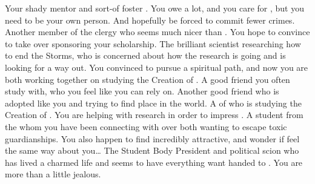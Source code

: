 \documentclass[char]{GL2020}
\begin{document}
\begin{contacts}
    \contact{\cAntiChup{}} Your shady mentor and sort-of foster \cAntiChup{\parent}. You owe \cAntiChup{\them} a lot, and you care for \cAntiChup{\them}, but you need to be your own person. And hopefully be forced to commit fewer crimes.
    \contact{\cBeetle{}} Another member of the \pTech{} clergy who seems much nicer than \cAntiChup{}. You hope to convince \cBeetle{\them} to take over sponsoring your scholarship.
    \contact{\cHeadScientist{}} The brilliant scientist researching how to end the Storms, who is concerned about how the research is going and is looking for a way out. You convinced \cHeadScientist{\them} to pursue a spiritual path, and now you are both working together on studying the Creation of \pEarth{}.
    \contact{\cTechStar{}} A good friend you often study with, who you feel like you can rely on.
    \contact{\cAmbition{}} Another good friend who is adopted like you and trying to find \cAmbition{\their} place in the world.
    \contact{\cEbbPriest{}} A \pShippie{} \cEbbPriest{\cleric} of \cEbb{} who is studying the Creation of \pEarth{}. You are helping with \cEbbPriest{\their} research in order to impress \cBeetle{}.
    \contact{\cAdopted{}} A student from the \pFarm{} whom you have been connecting with over both wanting to escape toxic guardianships. You also happen to find \cAdopted{\them} incredibly attractive, and wonder if \cAdopted{\they} feel\cAdopted{\verbs} the same way about you\ldots{}
    \contact{\cPresident{\full}} The Student Body President and political scion who has lived a charmed life and seems to have everything \cPresident{\they} want handed to \cPresident{\them}. You are more than a little jealous.
\end{contacts}
\end{document}
